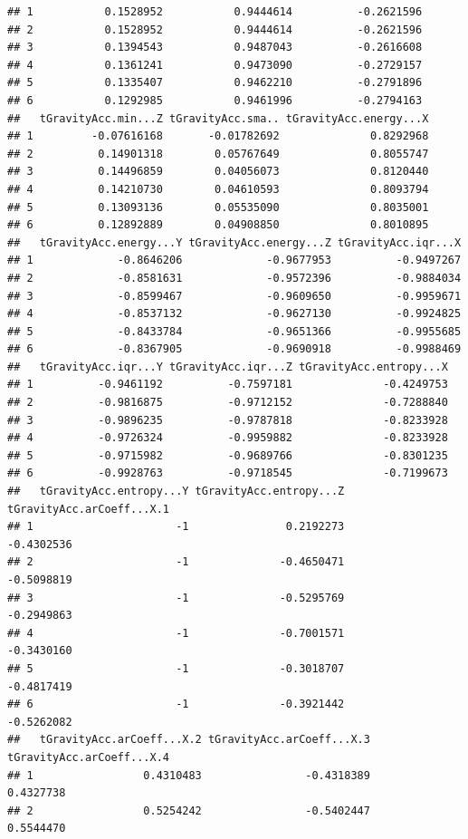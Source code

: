 \documentclass[
]{article}
\begin{document}
\begin{verbatim}
## 1           0.1528952           0.9444614          -0.2621596
## 2           0.1528952           0.9444614          -0.2621596
## 3           0.1394543           0.9487043          -0.2616608
## 4           0.1361241           0.9473090          -0.2729157
## 5           0.1335407           0.9462210          -0.2791896
## 6           0.1292985           0.9461996          -0.2794163
##   tGravityAcc.min...Z tGravityAcc.sma.. tGravityAcc.energy...X
## 1         -0.07616168       -0.01782692              0.8292968
## 2          0.14901318        0.05767649              0.8055747
## 3          0.14496859        0.04056073              0.8120440
## 4          0.14210730        0.04610593              0.8093794
## 5          0.13093136        0.05535090              0.8035001
## 6          0.12892889        0.04908850              0.8010895
##   tGravityAcc.energy...Y tGravityAcc.energy...Z tGravityAcc.iqr...X
## 1             -0.8646206             -0.9677953          -0.9497267
## 2             -0.8581631             -0.9572396          -0.9884034
## 3             -0.8599467             -0.9609650          -0.9959671
## 4             -0.8537132             -0.9627130          -0.9924825
## 5             -0.8433784             -0.9651366          -0.9955685
## 6             -0.8367905             -0.9690918          -0.9988469
##   tGravityAcc.iqr...Y tGravityAcc.iqr...Z tGravityAcc.entropy...X
## 1          -0.9461192          -0.7597181              -0.4249753
## 2          -0.9816875          -0.9712152              -0.7288840
## 3          -0.9896235          -0.9787818              -0.8233928
## 4          -0.9726324          -0.9959882              -0.8233928
## 5          -0.9715982          -0.9689766              -0.8301235
## 6          -0.9928763          -0.9718545              -0.7199673
##   tGravityAcc.entropy...Y tGravityAcc.entropy...Z tGravityAcc.arCoeff...X.1
## 1                      -1               0.2192273                -0.4302536
## 2                      -1              -0.4650471                -0.5098819
## 3                      -1              -0.5295769                -0.2949863
## 4                      -1              -0.7001571                -0.3430160
## 5                      -1              -0.3018707                -0.4817419
## 6                      -1              -0.3921442                -0.5262082
##   tGravityAcc.arCoeff...X.2 tGravityAcc.arCoeff...X.3 tGravityAcc.arCoeff...X.4
## 1                 0.4310483                -0.4318389                 0.4327738
## 2                 0.5254242                -0.5402447                 0.5544470

\end{verbatim}
\end{document}
